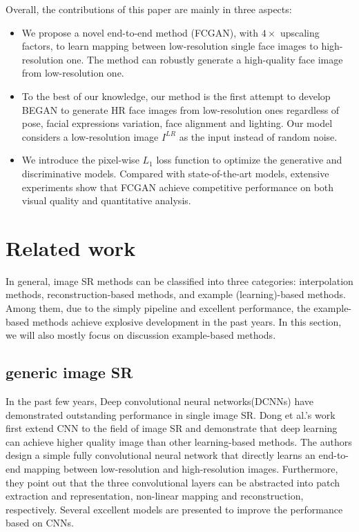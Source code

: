 \documentclass[conference,compsoc]{IEEEtran}
\begin{document}
Overall, the contributions of this paper are mainly in three aspects:

\begin{itemize}
  \item We propose a novel end-to-end method (FCGAN), with $4\times$ upscaling factors, to learn mapping between low-resolution single face images to high-resolution one. The method can robustly generate a high-quality face image from low-resolution one.
  \item To the best of our knowledge, our method is the first attempt to develop BEGAN\cite{David-BEGAN2017} to generate HR face images from low-resolution ones regardless of pose, facial expressions variation, face alignment and lighting. Our model considers a low-resolution image $I^{LR}$ as the input instead of random noise.
  \item We introduce the pixel-wise $L_1$ loss function to optimize the generative and discriminative models. Compared with state-of-the-art models, extensive experiments show that FCGAN achieve competitive performance on both visual quality and quantitative analysis.

\end{itemize}


\section{Related work}

In general, image SR methods can be classified into three categories: interpolation methods, reconstruction-based methods, and example (learning)-based methods. Among them, due to the simply pipeline and excellent performance, the example-based methods\cite{zhu2016deep, Jiang2016Noise-TCYB, jin2015robust, W2016DeepJFHR, Christian-SRGAN-CVPR2017, dong2016accelerating, Dong-He-PAMI2016Image, Jiang2016SRLSP, Kim_2016_DRCN, LapSRN_CVPR2017, Yu-URGAN-ECCV2016} achieve explosive development in the past years. In this section, we will also mostly focus on discussion example-based methods.

\subsection{generic image SR}
In the past few years, Deep convolutional neural networks(DCNNs) have demonstrated outstanding performance in single image SR. Dong et al.'s work\cite{Dong-He-PAMI2016Image} first extend CNN to the field of image SR and demonstrate that deep learning can achieve higher quality image than other learning-based methods. The authors design a simple fully convolutional neural network that directly learns an end-to-end mapping between low-resolution and high-resolution images. Furthermore, they point out that the three convolutional layers can be abstracted into patch extraction and representation, non-linear mapping and reconstruction, respectively. Several excellent models\cite{dong2016accelerating, Kim_2016_DRCN, LapSRN_CVPR2017} are presented to improve the performance based on CNNs.
\end{document}

